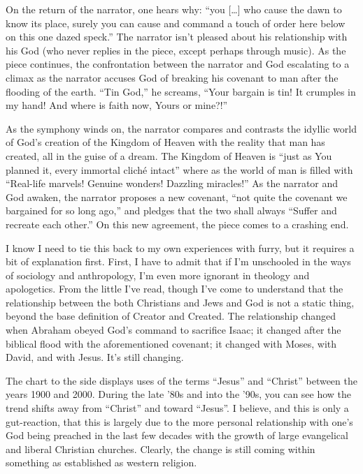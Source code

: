 On the return of the narrator, one hears why: ``you {[}\ldots{}{]} who cause the dawn to know its place, surely you can cause and command a touch of order here below on this one dazed speck.'' The narrator isn't pleased about his relationship with his God (who never replies in the piece, except perhaps through music). As the piece continues, the confrontation between the narrator and God escalating to a climax as the narrator accuses God of breaking his covenant to man after the flooding of the earth. ``Tin God,'' he screams, ``Your bargain is tin! It crumples in my hand! And where is faith now, Yours or mine?!''

As the symphony winds on, the narrator compares and contrasts the idyllic world of God's creation of the Kingdom of Heaven with the reality that man has created, all in the guise of a dream. The Kingdom of Heaven is ``just as You planned it, every immortal cliché intact'' where as the world of man is filled with ``Real-life marvels! Genuine wonders! Dazzling miracles!'' As the narrator and God awaken, the narrator proposes a new covenant, ``not quite the covenant we bargained for so long ago,'' and pledges that the two shall always ``Suffer and recreate each other.'' On this new agreement, the piece comes to a crashing end.

I know I need to tie this back to my own experiences with furry, but it requires a bit of explanation first. First, I have to admit that if I'm unschooled in the ways of sociology and anthropology, I'm even more ignorant in theology and apologetics. From the little I've read, though I've come to understand that the relationship between the both Christians and Jews and God is not a static thing, beyond the base definition of Creator and Created. The relationship changed when Abraham obeyed God's command to sacrifice Isaac; it changed after the biblical flood with the aforementioned covenant; it changed with Moses, with David, and with Jesus. It's still changing.

The chart to the side displays uses of the terms ``Jesus'' and ``Christ'' between the years 1900 and 2000. During the late '80s and into the '90s, you can see how the trend shifts away from ``Christ'' and toward ``Jesus''. I believe, and this is only a gut-reaction, that this is largely due to the more personal relationship with one's God being preached in the last few decades with the growth of large evangelical and liberal Christian churches. Clearly, the change is still coming within something as established as western religion.

